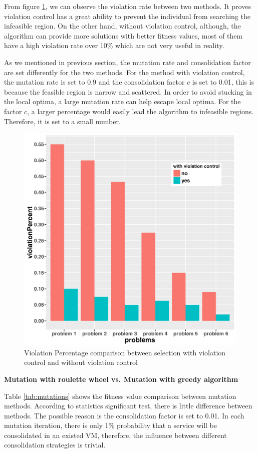 From figure \ref{fig:violations}, we can observe the violation rate between two methods.
It proves violation control has a great ability to prevent the individual from searching the infeasible region. On the other hand, without violation control, although, the algorithm can provide more solutions with better fitness values, most of them have a high violation rate over 10\% which are not very useful in reality.

As we mentioned in previous section, the mutation rate and consolidation factor are set differently for the two methods. For the method with violation control, the mutation rate is set to 0.9 and the consolidation factor $c$ is set to 0.01, this is because the feasible region is narrow and scattered. In order to avoid stucking in the local optima, a large mutation rate can help escape local optima. For the factor $c$, a larger percentage would easily lead the algorithm to infeasible regions. Therefore, it is set to a small number.





\begin{figure}
\centering
  \includegraphics[width=.7\textwidth]{pics/preliminary/violations.png}
  \caption{Violation Percentage comparison between selection with violation control and without violation control}
  \label{fig:violations}
\end{figure}



\begin{flushleft}\textbf{Mutation with roulette wheel vs. Mutation with greedy algorithm}\end{flushleft}
Table \ref{tab:mutations} shows the fitness value comparison between mutation methods. According
to statistics significant test, there is little difference between methods. The possible reason
is the consolidation factor is set to 0.01. In each mutation iteration, there is only 1\% probability
that a service will be consolidated in an existed VM, therefore, the influence between
different consolidation strategies is trivial.





